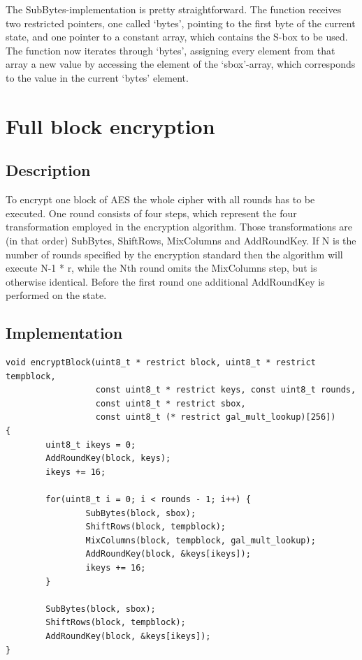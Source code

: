 The SubBytes-implementation is pretty straightforward. The function
receives two restricted pointers, one called `bytes', pointing to the
first byte of the current state, and one pointer to a constant array,
which contains the S-box to be used. The function now iterates through
`bytes', assigning every element from that array a new value by
accessing the element of the `sbox'-array, which corresponds to the
value in the current `bytes' element.

\hypertarget{full-block-encryption}{%
\section{Full block encryption}\label{full-block-encryption}}

\hypertarget{description-6}{%
\subsection{Description}\label{description-6}}

To encrypt one block of AES the whole cipher with all rounds has to be
executed. One round consists of four steps, which represent the four
transformation employed in the encryption algorithm. Those transformations are (in that order) SubBytes, ShiftRows, MixColumns and AddRoundKey.
If N is the number of rounds specified by the encryption standard then
the algorithm will execute N-1 * r, while the Nth round omits the
MixColumns step, but is otherwise identical. Before the first round one
additional AddRoundKey is performed on the state. \cite[ch. 5.1]{aes2001}

\hypertarget{implementation-5}{%
\subsection{Implementation}\label{implementation-5}}

\begin{lstlisting}
void encryptBlock(uint8_t * restrict block, uint8_t * restrict tempblock,
                  const uint8_t * restrict keys, const uint8_t rounds,
                  const uint8_t * restrict sbox,
                  const uint8_t (* restrict gal_mult_lookup)[256])
{
        uint8_t ikeys = 0;
        AddRoundKey(block, keys);
        ikeys += 16;

        for(uint8_t i = 0; i < rounds - 1; i++) {
                SubBytes(block, sbox);
                ShiftRows(block, tempblock);
                MixColumns(block, tempblock, gal_mult_lookup);
                AddRoundKey(block, &keys[ikeys]);
                ikeys += 16;
        }

        SubBytes(block, sbox);
        ShiftRows(block, tempblock);
        AddRoundKey(block, &keys[ikeys]);
}
\end{lstlisting}

